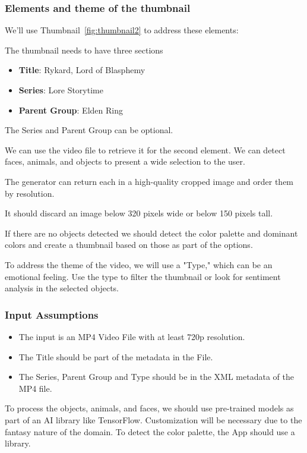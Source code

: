 \documentclass{article}
\begin{document}
\subsubsection{Elements and theme of the thumbnail}

We'll use Thumbnail~\ref{fig:thumbnail2} to address these elements:

The thumbnail needs to have three sections

\begin{itemize}
  \item \textbf{Title}: Rykard, Lord of Blasphemy
  \item \textbf{Series}: Lore Storytime
  \item \textbf{Parent Group}: Elden Ring
\end{itemize}

The Series and Parent Group can be optional. 

We can use the video file to retrieve it for the second element. We can detect faces, animals, and objects to present a wide selection to the user. 

The generator can return each in a high-quality cropped image and order them by resolution. 

It should discard an image below 320 pixels wide or below 150 pixels tall.

If there are no objects detected we should detect the color palette and dominant colors and create a thumbnail based on those as part of the options.

To address the theme of the video, we will use a "Type," which can be an emotional feeling. Use the type to filter the thumbnail or look for sentiment analysis in the selected objects. 

\subsubsection{Input Assumptions}

\begin{itemize}
  \item The input is an MP4 Video File with at least 720p resolution. 
  \item The Title should be part of the metadata in the File.
  \item The Series, Parent Group and Type should be in the XML metadata of the MP4 file.
\end{itemize}

To process the objects, animals, and faces, we should use pre-trained models as part of an AI library like TensorFlow. Customization will be necessary due to the fantasy nature of the domain. To detect the color palette, the App should use a library.
\end{document}
